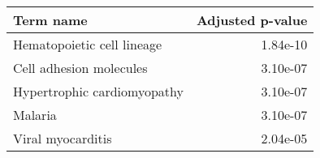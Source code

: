 \begin{tabular}{lr}
\toprule
                  Term name &  Adjusted p-value \\
\midrule
 Hematopoietic cell lineage &          1.84e-10 \\
    Cell adhesion molecules &          3.10e-07 \\
Hypertrophic cardiomyopathy &          3.10e-07 \\
                    Malaria &          3.10e-07 \\
          Viral myocarditis &          2.04e-05 \\
\bottomrule
\end{tabular}
